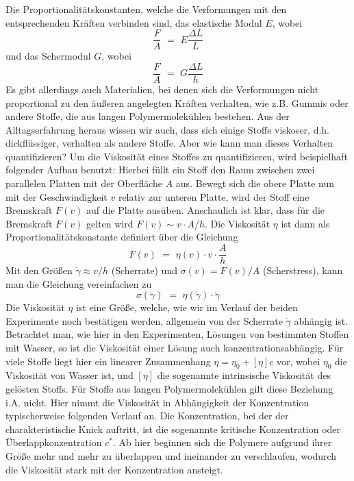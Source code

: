 \documentclass[11pt,a4paper,oneside]{scrartcl}
\begin{document}
Die Proportionalitätskonstanten, welche die Verformungen mit den entsprechenden Kräften verbinden sind, das elastische
Modul $E$, wobei
\begin{equation}
\frac{F}{A} \,\,=\,\, E \frac{\Delta L}{L}
\end{equation}
und das Schermodul $G$, wobei
\begin{equation}
\frac{F}{A} \,\,=\,\, G \frac{\Delta L}{h}
\end{equation}
Es gibt allerdings auch Materialien, bei denen sich die Verformungen nicht proportional zu den äußeren angelegten Kräften verhalten, wie z.B. Gummis oder andere Stoffe, die aus langen Polymermolekühlen
bestehen.
Aus der Alltagserfahrung heraus wissen wir auch, dass sich einige Stoffe viskoser, d.h. dickflüssiger, verhalten als andere Stoffe. Aber wie kann man dieses Verhalten quantifizieren?
Um die Viskosität eines Stoffes zu quantifizieren, wird beispielhaft folgender Aufbau benutzt: 
Hierbei füllt ein Stoff den Raum zwischen zwei parallelen Platten mit der Oberfläche $A$ aus.
Bewegt sich die obere Platte nun mit der Geschwindigkeit $v$ relativ zur unteren Platte, wird der Stoff eine Bremskraft $F(v)$ auf die Platte ausüben. Anschaulich ist klar, dass für
die Bremskraft $F(v)$ gelten wird $F(v) \sim v \cdot A/h$. Die Viskosität $\eta$ ist dann als Proportionalitätskonstante definiert über die Gleichung
\begin{equation}
F(v) \,\,=\,\, \eta (v) \cdot v \cdot \frac{A}{h}
\end{equation}
Mit den Größen $\dot{\gamma} \approx v/h$ (Scherrate) und $\sigma(v) = F(v)/A$ (Scherstress), kann man die Gleichung vereinfachen zu
\begin{equation}
\sigma(\dot{\gamma}) \,\,=\,\, \eta (\dot{\gamma}) \cdot \dot{\gamma} 
\end{equation}
Die Viskosität $\eta$ ist eine Größe, welche, wie wir im Verlauf der beiden Experimente noch bestätigen werden, allgemein von der Scherrate $\dot\gamma$ abhängig ist.\\
Betrachtet man, wie hier in den Experimenten, Lösungen von bestimmten Stoffen mit Wasser, so ist die Viskosität einer Lösung auch konzentrationsabhängig. Für viele Stoffe liegt hier ein linearer
Zusammenhang $\eta = \eta_0 + [\eta]c$ vor, wobei $\eta_0$ die Viskosität von Wasser ist, und $[\eta]$ die sogenannte intrinsische Viskosität des gelösten Stoffs.
Für Stoffe aus langen Polymermolekühlen gilt diese Beziehung i.A. nicht. Hier nimmt die Viskosität in Abhängigkeit der Konzentration typischerweise folgenden Verlauf an.
 Die Konzentration, bei der 
der charakteristische Knick auftritt, ist die sogenannte kritische Konzentration oder Überlappkonzentration $c^{*}$. Ab hier beginnen sich die Polymere aufgrund ihrer Größe mehr und mehr zu überlappen und ineinander zu verschlaufen, wodurch die Viskosität stark mit der Konzentration ansteigt.
\end{document}
